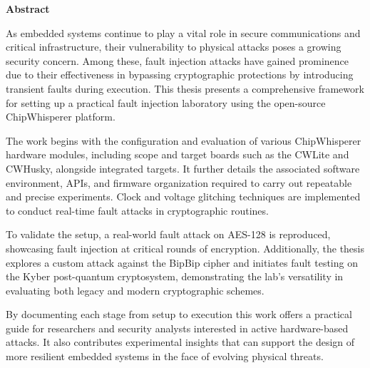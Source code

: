 \cleardoublepage
{}
{}
\thispagestyle{empty}
\textbf{\hspace{0pt plus 1filll}\huge Abstract}
\vspace{15mm}

    As embedded systems continue to play a vital role in secure communications and critical infrastructure, their vulnerability to physical attacks poses a growing security concern. Among these, fault injection attacks have gained prominence due to their effectiveness in bypassing cryptographic protections by introducing transient faults during execution. This thesis presents a comprehensive framework for setting up a practical fault injection laboratory using the open-source ChipWhisperer platform.
    
    The work begins with the configuration and evaluation of various ChipWhisperer hardware modules, including scope and target boards such as the CWLite and CWHusky, alongside integrated targets. It further details the associated software environment, APIs, and firmware organization required to carry out repeatable and precise experiments. Clock and voltage glitching techniques are implemented to conduct real-time fault attacks in cryptographic routines.
    
    To validate the setup, a real-world fault attack on AES-128 is reproduced, showcasing fault injection at critical rounds of encryption. Additionally, the thesis explores a custom attack against the BipBip cipher and initiates fault testing on the Kyber post-quantum cryptosystem, demonstrating the lab's versatility in evaluating both legacy and modern cryptographic schemes.
    
    By documenting each stage from setup to execution this work offers a practical guide for researchers and security analysts interested in active hardware-based attacks. It also contributes experimental insights that can support the design of more resilient embedded systems in the face of evolving physical threats.
    